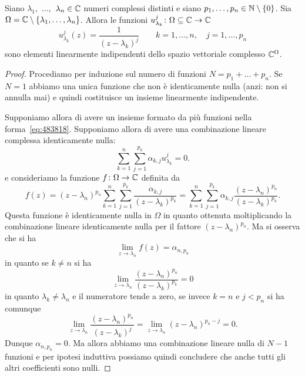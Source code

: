 \begin{lemma}
\label{lemma:72995}
Siano $\lambda_1,$ $\dots,$ $\lambda_n \in \mathbb C$ numeri complessi
distinti e siano $p_1,\dots,p_n \in \mathbb N\setminus{\left\{ 0 \right\}}$.
Sia $\Omega = \mathbb C \setminus \{\lambda_1, \dots, \lambda_n\}$.
Allora le funzioni
$u_{\lambda_k}^{j}\colon \Omega\subseteq \mathbb C \to \mathbb C$
\begin{equation}
\label{eq:483818}
  u_{\lambda_k}^{j}(z) = \frac{1}{(z-\lambda_k)^{j}}
  \qquad k=1,\dots,n, \quad j=1,\dots, p_n
\end{equation}
sono elementi linearmente indipendenti dello spazio
vettoriale complesso $\mathbb C^\Omega$.
\end{lemma}
%
\begin{proof}
Procediamo per induzione sul numero di funzioni
$N=p_1+ \dots + p_n$.
Se $N=1$ abbiamo una unica funzione che non è identicamente
nulla (anzi: non si annulla mai)
e quindi costituisce un insieme linearmente indipendente.

Supponiamo allora di avere un insieme formato da più funzioni
nella forma~\eqref{eq:483818}.
Supponiamo allora di avere
una combinazione lineare complessa identicamente nulla:
\[
\sum_{k=1}^n \sum_{j=1}^{p_k} \alpha_{k,j} u_{\lambda_k}^j = 0.
\]
e consideriamo la funzione $f\colon \Omega \to \mathbb C$
definita da
\begin{equation}
\label{eq:567384}
  f(z)
  = (z-\lambda_n)^{p_n}\sum_{k=1}^n \sum_{j=1}^{p_k} \frac{\alpha_{k,j}}{(z-\lambda_k)^{p_k}}
  = \sum_{k=1}^n \sum_{j=1}^{p_k} \alpha_{k,j}\frac{(z-\lambda_n)^{p_n}}{(z-\lambda_k)^{p_k}}.
\end{equation}
Questa funzione è identicamente nulla
in $\Omega$ in quanto ottenuta moltiplicando la combinazione lineare identicamente
nulla per il fattore $(z-\lambda_n)^{p_n}$.
Ma si osserva che si ha
\[
  \lim_{z\to \lambda_n} f(z) = \alpha_{n,p_n}
\]
in quanto se $k\neq n$ si ha
\[
\lim_{z\to \lambda_n}\frac{(z-\lambda_n)^{p_n}}{(z-\lambda_k)^{p_k}} = 0
\]
in quanto $\lambda_k\neq \lambda_n$ e il numeratore
tende a zero, se invece $k=n$ e $j<p_n$ si ha comunque
\[
\lim_{z\to \lambda_n}\frac{(z-\lambda_n)^{p_n}}{(z-\lambda_k)^{j}}
= \lim_{z\to \lambda_n}(z-\lambda_n)^{p_n-j} = 0.
\]
Dunque $\alpha_{n,p_n}=0$.
Ma allora abbiamo una combinazione lineare nulla di $N-1$
funzioni e per ipotesi induttiva possiamo quindi concludere
che anche tutti gli altri coefficienti sono nulli.
\end{proof}

